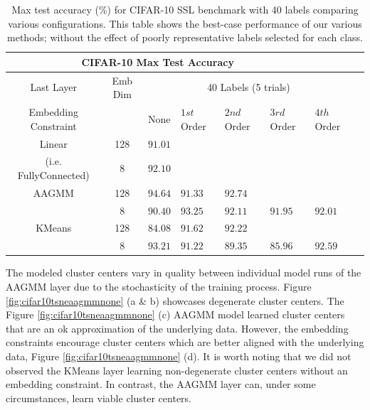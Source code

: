 \documentclass[10pt,twocolumn,letterpaper]{article}
\begin{document}
\begin{table}[ht!]
	\begin{tabularx}{\textwidth}{c|c|XXXXXX}
		\multicolumn{6}{c}{CIFAR-10 Max Test Accuracy} \\ \hline\hline
		Last Layer &   Emb Dim   & \multicolumn{5}{c}{40 Labels (5 trials)}            \\ 
		\hline
		Embedding Constraint  &  & None & $1st$ Order & $2nd$ Order & $3rd$ Order & $4th$ Order  \\ 
		\hline
		Linear & 128  & $91.01$   &  &  &  &   \\
		(i.e. FullyConnected) & 8  & $92.10$    &  &  &  &   \\
		\hline
		AAGMM  & 128  & $\boldsymbol{94.64}$    & $91.33$   & $92.74$   &  &  \\
		& 8  & $90.40$    & $93.25$   & $92.11$   & $91.95$  & $92.01$  \\
		\hline
		KMeans & 128  & $84.08$    & $91.62$   & $92.22$  &  &  \\
		& 8  & $\boldsymbol{93.21}$    & $91.22$  & $89.35$  & $85.96$  & $92.59$  \\
	\end{tabularx}
	\caption{Max test accuracy (\%) for CIFAR-10 SSL benchmark with 40 labels comparing various configurations. This table shows the best-case performance of our various methods; without the effect of poorly representative labels selected for each class. }
	\label{tablemaxcf10}
\end{table}

The modeled cluster centers vary in quality between individual model runs of the AAGMM layer due to the stochasticity of the training process.
Figure \ref{fig:cifar10tsneaagmmnone} (a \& b) showcases degenerate cluster centers.
The Figure \ref{fig:cifar10tsneaagmmnone} (c) AAGMM model learned cluster centers that are an ok approximation of the underlying data.
However, the embedding constraints encourage cluster centers which are better aligned with the underlying data, Figure \ref{fig:cifar10tsneaagmmnone} (d).
It is worth noting that we did not observed the KMeans layer learning non-degenerate cluster centers without an embedding constraint.
In contrast, the AAGMM layer can, under some circumstances, learn viable cluster centers.
\end{document}
